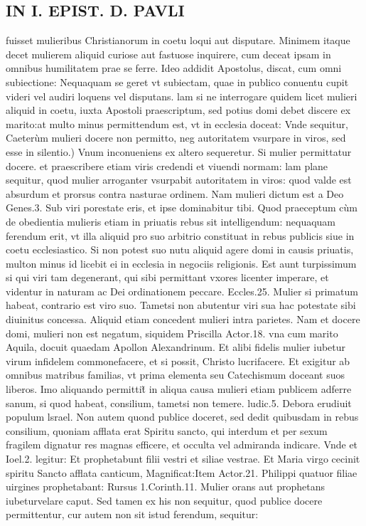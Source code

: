 \documentclass{article}
\begin{document}
\begin{pages}
\section*{IN I. EPIST. D. PAVLI }
\marginpar{[ p.72 ]}\pstart fuisset mulieribus Christianorum in coetu loqui aut disputare. Minimem itaque  decet mulierem aliquid curiose aut fastuose inquirere, cum deceat ipsam in omnibus humilitatem prae se ferre. Ideo addidit Apostolus, discat, cum omni subiectione: Nequaquam se geret vt subiectam, quae in publico conuentu cupit videri vel audiri loquens vel disputans. lam si ne interrogare quidem licet mulieri aliquid in coetu, iuxta Apostoli praescriptum, sed potius domi debet discere ex marito:at multo minus permittendum est, vt in ecclesia doceat: Vnde sequitur,  \pend\pstart Caeterùm mulieri docere non permitto, neg autoritatem vsurpare in viros, sed esse in silentio.) Vnum inconueniens ex altero sequeretur. Si mulier permittatur docere. et praescribere etiam viris credendi et viuendi normam: lam plane sequitur, quod mulier arroganter vsurpabit autoritatem in viros: quod valde est absurdum et prorsus contra nasturae ordinem. Nam mulieri dictum est a Deo Genes.3. Sub viri porestate eris, et ipse dominabitur tibi. Quod praeceptum cùm de obedientia mulieris etiam in priuatis rebus sit intelligendum: nequaquam ferendum erit, vt illa aliquid pro suo arbitrio constituat in rebus publicis siue in coetu ecclesiastico. Si non potest suo nutu aliquid agere domi in causis priuatis, multon minus id licebit ei in ecclesia in negociis religionis. Est aunt turpissimum si qui viri tam degenerant, qui sibi permittant vxores licenter imperare, et videntur in naturam ac Dei ordinationem peccare. Eccles.25. Mulier si primatum habeat, contrario est viro suo. Tametsi non abutentur viri sua hac potestate sibi diuinitus concessa. Aliquid etiam concedent mulieri intra parietes. Nam et docere domi, mulieri non est negatum, siquidem Priscilla Actor.18. vna cum marito Aquila, docuit quaedam Apollon Alexandrinum. Et alibi fidelis mulier iubetur virum infidelem commonefacere, et si possit, Christo lucrifacere. Et exigitur ab omnibus matribus  familias, vt prima elementa seu Catechismum doceant suos liberos. Imo aliquando permittit̃ in aliqua causa mulieri etiam publicem adferre sanum, si quod habeat, consilium, tametsi non temere. ludic.5. Debora erudiuit populum lsrael. Non autem quond publice doceret, sed dedit quibusdam in rebus consilium, quoniam afflata erat Spiritu sancto, qui interdum et per sexum fragilem dignatur res magnas efficere, et occulta vel admiranda indicare. Vnde et Ioel.2. legitur: Et prophetabunt filii vestri et siliae vestrae. Et Maria virgo cecinit spiritu Sancto afflata canticum, Magnificat:Item Actor.21. Philippi quatuor filiae uirgines prophetabant: Rursus 1.Corinth.11. Mulier orans aut prophetans iubeturvelare caput. Sed tamen ex his non sequitur, quod publice docere permittentur, cur autem non sit istud ferendum, sequitur:  \pend
{}
{}

\end{pages}
\end{document}
